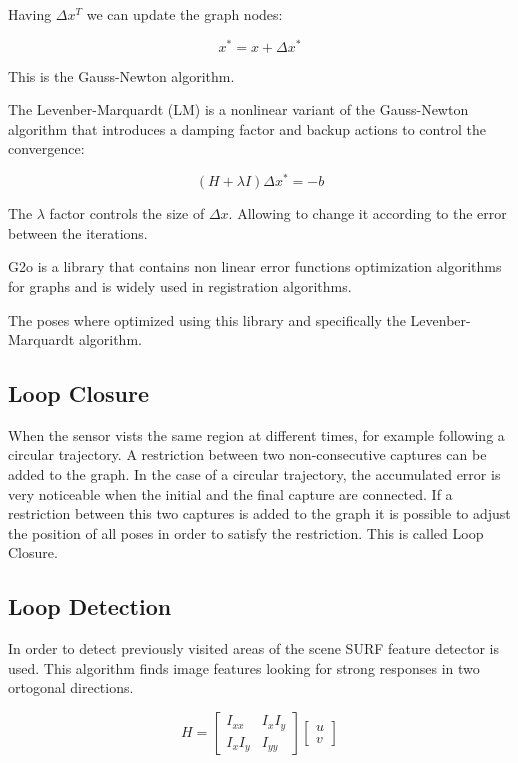 Having $\Delta x^T$ we can update the graph nodes:

\begin{equation}
x^* = x + \Delta x^* 
\end{equation}

This is the Gauss-Newton algorithm. 

The Levenber-Marquardt (LM) is a nonlinear variant of the Gauss-Newton algorithm that introduces a
damping factor and backup actions to control the convergence:

\begin{equation}
(H + \lambda I) \Delta x^* = -b
\end{equation}

The $\lambda$ factor controls the size of $ \Delta x$. Allowing to change it according to the error between the iterations.
 


G2o is a library that contains non linear error functions optimization 
algorithms for graphs and is widely used in registration algorithms. 

The poses where optimized using this library and specifically the 
Levenber-Marquardt algorithm.



\subsection{Loop Closure}

When the sensor vists the same region at different times, for example following 
a circular trajectory. A restriction between two non-consecutive captures can be 
added to the graph. In the case of a circular trajectory, the accumulated error 
is very noticeable when the initial and the final capture are connected. If a 
restriction between this two captures is added to the graph it is possible to 
adjust the position of all poses in order to satisfy the restriction. This 
is called Loop Closure.



\subsection{Loop Detection}

In order to detect previously visited areas of the scene SURF \cite{Bay06surf} feature detector 
is used. This algorithm finds image features looking for strong responses in two ortogonal directions. 


$$
H = \begin{bmatrix} I_{xx} & I_x I_y \\ I_x I_y & I_{yy} \end{bmatrix} \begin{bmatrix} u \\ v \end{bmatrix}
$$

